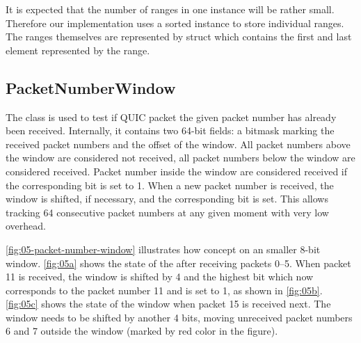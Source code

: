 It is expected that the number of ranges in one \RangeSet{} instance will be rather small. Therefore
our implementation uses a sorted  instance to store individual ranges. The ranges
themselves are represented by  struct which contains the first and last
element represented by the range.

\subsection{PacketNumberWindow}

The \PacketNumberWindow{} class is used to test if QUIC packet the given packet number has already
been received. Internally, it contains two 64-bit  fields: a bitmask marking the
received packet numbers and the offset of the window. All packet numbers above the window are
considered not received, all packet numbers below the window are considered received. Packet number
inside the window are considered received if the corresponding bit is set to 1. When a new packet
number is received, the window is shifted, if necessary, and the corresponding bit is set. This
allows tracking 64 consecutive packet numbers at any given moment with very low overhead.

\autoref{fig:05-packet-number-window} illustrates how concept on an smaller 8-bit window.
\autoref{fig:05a} shows the state of the \PacketNumberWindow{} after receiving packets 0--5. When
packet 11 is received, the window is shifted by 4 and the highest bit which now corresponds to the
packet number 11 and is set to 1, as shown in \autoref{fig:05b}. \autoref{fig:05c} shows the state
of the window when packet 15 is received next. The window needs to be shifted by another 4 bits,
moving unreceived packet numbers 6 and 7 outside the window (marked by red color in the figure).

\newlength{\origframesep}
\setlength{\fboxsep}{0.12em}

